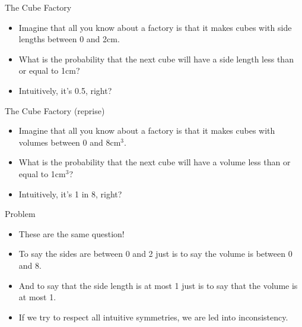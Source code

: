 \documentclass[
  ignorenonframetext,
]{beamer}
\providecommand{\tightlist}{%
  \setlength{\itemsep}{0pt}\setlength{\parskip}{0pt}}
\renewcommand{\,}{\text{, }}
\begin{document}
\begin{frame}{The Cube Factory}
\protect\hypertarget{the-cube-factory-1}{}

\begin{itemize}
\tightlist
\item
  Imagine that all you know about a factory is that it makes cubes with
  side lengths between 0 and 2cm.
\item
  What is the probability that the next cube will have a side length
  less than or equal to 1cm? \pause
\item
  Intuitively, it's 0.5, right?
\end{itemize}

\end{frame}

\begin{frame}{The Cube Factory (reprise)}
\protect\hypertarget{the-cube-factory-reprise-1}{}

\begin{itemize}
\tightlist
\item
  Imagine that all you know about a factory is that it makes cubes with
  volumes between 0 and 8cm\(^3\).
\item
  What is the probability that the next cube will have a volume less
  than or equal to 1cm\(^3\)? \pause
\item
  Intuitively, it's 1 in 8, right?
\end{itemize}

\end{frame}

\begin{frame}{Problem}
\protect\hypertarget{problem-1}{}

\begin{itemize}
\tightlist
\item
  These are the same question!
\item
  To say the sides are between 0 and 2 just is to say the volume is
  between 0 and 8.
\item
  And to say that the side length is at most 1 just is to say that the
  volume is at most 1.
\item
  If we try to respect all intuitive symmetries, we are led into
  inconsistency.
\end{itemize}

\end{frame}
\end{document}
